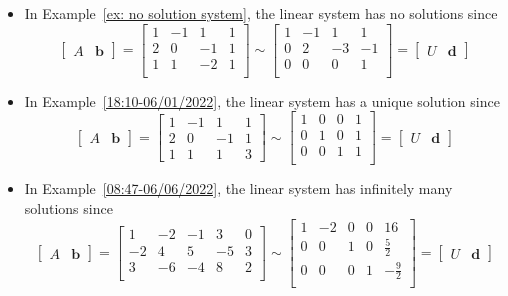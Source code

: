 \documentclass{beamer}
\theoremstyle{definition}
\theoremstyle{remark}
\begin{document}
\begin{frame}[t]
\begin{example}\hfill
\begin{itemize}
\item In Example~\ref{ex: no solution system}, the linear system has no solutions since
\[
\begin{bmatrix}
A&\mathbf b
\end{bmatrix}=
\begin{bmatrix}
1&-1&1&1\\
2&0&-1&1\\
1&1&-2&1\\
\end{bmatrix}\sim\begin{bmatrix}
1&-1&1&1\\
0&2&-3&-1\\
0&0&0&1\\
\end{bmatrix}=\begin{bmatrix}
U&\mathbf d
\end{bmatrix}
\]
\item In Example~\ref{18:10-06/01/2022}, the linear system has a unique solution since
\[
\begin{bmatrix}
A&\mathbf b
\end{bmatrix}=\begin{bmatrix}
1&−1 &1& 1\\
2&0 &−1 &1\\
1&1&1 &3
\end{bmatrix}\sim\begin{bmatrix}
1&0&0&1\\
0&1&0&1\\
0&0&1&1\\
\end{bmatrix}=\begin{bmatrix}
U&\mathbf d
\end{bmatrix}
\]
\item In Example~\ref{08:47-06/06/2022}, the linear system has infinitely many solutions since
\[
\begin{bmatrix}
A&\mathbf b
\end{bmatrix}=\begin{bmatrix}
1&-2&-1&3&0\\
-2&4&5&-5&3\\
3&-6&-4&8&2\\
\end{bmatrix}\sim\begin{bmatrix}
1&-2&0&0&16\\
0&0&1&0&\frac{5}{2}\\
0&0&0&1&-\frac{9}{2}\\
\end{bmatrix}=\begin{bmatrix}
U&\mathbf d
\end{bmatrix}
\]
\end{itemize}
\end{example}
\end{frame}
\end{document}
